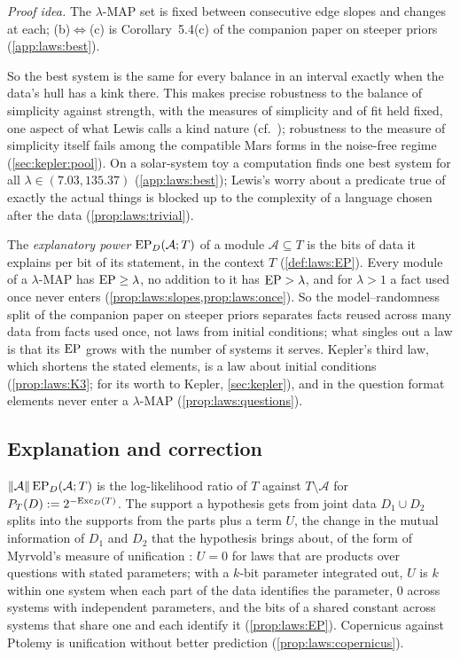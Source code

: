 \emph{Proof idea.} The $\lambda$-MAP set is fixed between consecutive edge slopes and changes at each; (b)$\Leftrightarrow$(c) is Corollary~5.4(c) of the companion paper on steeper priors (\cref{app:laws:best}).

So the best system is the same for every balance in an interval exactly when the data's hull has a kink there. This makes precise robustness to the balance of simplicity against strength, with the measures of simplicity and of fit held fixed, one aspect of what Lewis calls a kind nature (cf.\ \citealp{lewis1994humean}); robustness to the measure of simplicity itself fails among the compatible Mars forms in the noise-free regime (\cref{sec:kepler:pool}). On a solar-system toy a computation finds one best system for all $\lambda\in(7.03,135.37)$ (\cref{app:laws:best}); Lewis's worry about a predicate true of exactly the actual things is blocked up to the complexity of a language chosen after the data (\cref{prop:laws:trivial}).

The \emph{explanatory power} $\mathrm{EP}_D(\mathcal A;T)$ of a module $\mathcal A\subseteq T$ is the bits of data it explains per bit of its statement, in the context $T$ (\cref{def:laws:EP}). Every module of a $\lambda$-MAP has $\mathrm{EP}\ge\lambda$, no addition to it has $\mathrm{EP}>\lambda$, and for $\lambda>1$ a fact used once never enters (\cref{prop:laws:slopes,prop:laws:once}). So the model--randomness split of the companion paper on steeper priors separates facts reused across many data from facts used once, not laws from initial conditions; what singles out a law is that its $\mathrm{EP}$ grows with the number of systems it serves. Kepler's third law, which shortens the stated elements, is a law about initial conditions (\cref{prop:laws:K3}; for its worth to Kepler, \cref{sec:kepler}), and in the question format elements never enter a $\lambda$-MAP (\cref{prop:laws:questions}).

\subsection{Explanation and correction}\label{sec:laws:explain}

$\lVert\mathcal A\rVert\,\mathrm{EP}_D(\mathcal A;T)$ is the log-likelihood ratio of $T$ against $T\setminus\mathcal A$ for $P_T(D):=2^{-\mathrm{Exc}_D(T)}$. The support a hypothesis gets from joint data $D_1\cup D_2$ splits into the supports from the parts plus a term $U$, the change in the mutual information of $D_1$ and $D_2$ that the hypothesis brings about, of the form of Myrvold's measure of unification \citep{myrvold2003bayesian}: $U=0$ for laws that are products over questions with stated parameters; with a $k$-bit parameter integrated out, $U$ is $k$ within one system when each part of the data identifies the parameter, $0$ across systems with independent parameters, and the bits of a shared constant across systems that share one and each identify it (\cref{prop:laws:EP}). Copernicus against Ptolemy is unification without better prediction (\cref{prop:laws:copernicus}).

